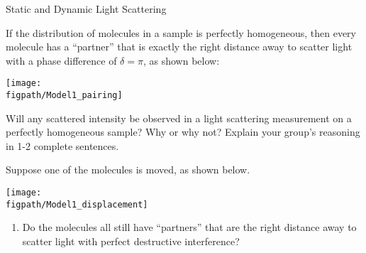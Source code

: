 \begin{activity}{Static and Dynamic Light Scattering}
%		
%	
%		
%	
%	
%	



\begin{model}
	
	If the distribution of molecules in a sample is perfectly homogeneous, then every molecule has a ``partner'' that is exactly the right distance away to scatter light with a phase difference of $\delta = \pi$, as shown below:
	
	\centerline{\texttt{[image: \\figpath/Model1\_pairing]}}
	
\end{model}


\begin{ctqs}
	
	\question Will any scattered intensity be observed in a light scattering measurement on a perfectly homogeneous sample?  Why or why not?  Explain your group's reasoning in 1-2 complete sentences.
	
		\begin{solution}[1.5in]{}
		\end{solution}

	\question Suppose one of the molecules is moved, as shown below.
	
	\vspace{6pt}
	\centerline{\texttt{[image: \\figpath/Model1\_displacement]}}

		\begin{enumerate}
			\item Do the molecules all still have ``partners'' that are the right distance away to scatter light with perfect destructive interference? 
	
		\begin{solution}[0.5in]{}
		\end{solution}
			

\end{enumerate}
\end{ctqs}
\end{activity}
